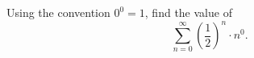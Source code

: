 Using the convention $0^0=1$, find the value of
\[\sum_{n=0}^{\infty}\left(\dfrac{1}{2}\right)^n\cdot n^0 .\]
